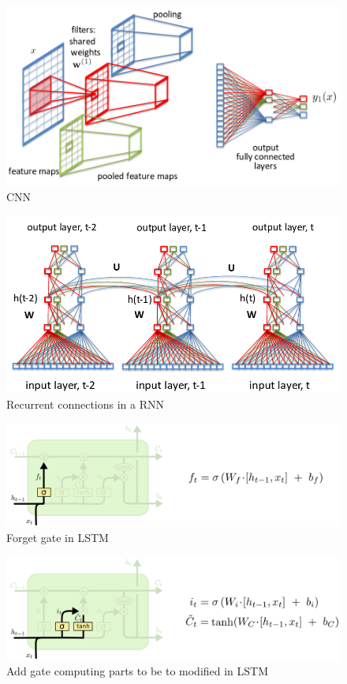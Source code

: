 \documentclass[a4paper]{article}
\begin{document}
\begin{figure}
  \includegraphics[width=.99\linewidth]{img/cnn.png}
  \caption{CNN}
  \label{fig:cnn}
\end{figure}


\begin{figure}
  \includegraphics[width=.99\linewidth]{img/rnn.png}
  \caption{Recurrent connections in a RNN}
  \label{fig:rnn}
\end{figure}


\begin{figure}
  \includegraphics[width=.99\linewidth]{img/lstm_forget.png}
  \caption{Forget gate in LSTM}
  \label{fig:lstm_forget}
\end{figure}


\begin{figure}
  \includegraphics[width=.99\linewidth]{img/lstm_add.png}
  \caption{Add gate computing parts to be to modified in LSTM}
  \label{fig:lstm_add}
\end{figure}
\end{document}
